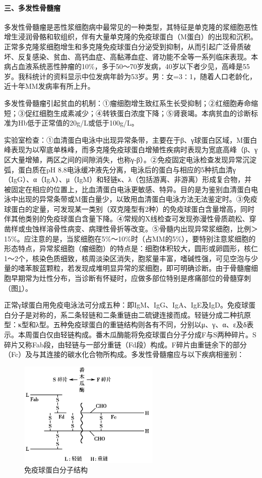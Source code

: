 \paragraph{三、多发性骨髓瘤}

多发性骨髓瘤是恶性浆细胞病中最常见的一种类型，其特征是单克隆的浆细胞恶性增生浸润骨骼和软组织，伴有大量单克隆的免疫球蛋白（M蛋白）的出现和沉积。正常多克隆浆细胞增生和多克隆免疫球蛋白分泌受到抑制，从而引起广泛骨质破坏、反复感染、贫血、高钙血症、高黏滞血症、肾功能不全等一系列临床表现。本病占血液系统恶性肿瘤的10\%，多于50～70岁发病，40岁以下者少见，高峰是55岁。我科统计的资料显示中位发病年龄为53岁。男∶女=3∶1，随着人口老龄化，近十年MM发病率有所上升。

多发性骨髓瘤引起贫血的机制：①瘤细胞增生致红系生长受抑制；②红细胞寿命缩短；③促红细胞生成素减少；④转铁蛋白浓度下降；⑤肾衰竭。本病贫血的诊断标准为Hb低于正常值的20g/L或低于100g/L。

实验室检查：①血清蛋白电泳中出现异常条带，主要在于β、γ球蛋白区域，M蛋白峰表现为以窄底单株峰，而多克隆免疫球蛋白增殖性疾病时表现为宽底高峰（β、γ区大量增殖，两区之间的间隙消失，也称γ-β）。②免疫固定电泳检查发现异常沉淀弧，蛋白质在pH
8.8电泳缓冲液先分离，电泳后的蛋白与相应的5种抗血清γ（IgG）、α（IgA）、μ（IgM）和轻链κ、λ（包括游离、非游离）形成复合物，并被固定在相应的位置上，比血清蛋白电泳更敏感、特异。目的是为鉴别血清蛋白电泳中出现的异常条带或M蛋白量少，以致用血清蛋白电泳方法无法鉴定时。③免疫球蛋白的定量，可发现某一类别（双克隆型有2种）的免疫球蛋白含量增高，同时伴其他类别的免疫球蛋白含量下降。④常规的X线检查可发现弥漫性骨质疏松、穿凿样或虫蚀样溶骨性病变、病理性骨折等改变。⑤骨髓内出现异常浆细胞，比例＞15\%。应注意的是，当浆细胞在5\%～10\%时（占MM的5\%），要特别注意浆细胞的形态特点，异常浆细胞（瘤细胞）的特点是：细胞体积较大，圆形或卵圆形，核仁1～2个，核染色质细致，核周淡染区消失，胞浆量丰富，嗜碱性强，可见空泡与少量的嗜苯胺蓝颗粒，若发现成堆明显异常的浆细胞，即可明确诊断。由于骨髓瘤细胞早期常为灶性分布，当诊断有怀疑时，应做多部位特别是疼痛部位的骨髓穿刺（图\ref{fig33-8}）。

正常γ球蛋白用免疫电泳法可分成五种：即IgM、IgG、IgA、IgE及IgD。免疫球蛋白分子是对称的，系二条轻链和二条重链由二硫键连接而成。轻链分成二种抗原型：κ型和λ型。五种免疫球蛋白的重链结构则各有不同，分别以μ、γ、α、ε及δ表示。本周蛋白仅由轻链构成。番木瓜酶能将免疫球蛋白分子分成F与S两种碎片。S碎片又称Fab段，由轻链与一部分重链（Fd段）构成。F碎片由重链余下的部分（Fc）及与其连接的碳水化合物所构成。多发性骨髓瘤应与以下疾病相鉴别：

\begin{figure}[!htbp]
 \centering
 \includegraphics[width=2.66667in,height=1.98958in]{./images/Image00189.jpg}
 \captionsetup{justification=centering}
 \caption{免疫球蛋白分子结构}
 \label{fig33-8}
  \end{figure} 

